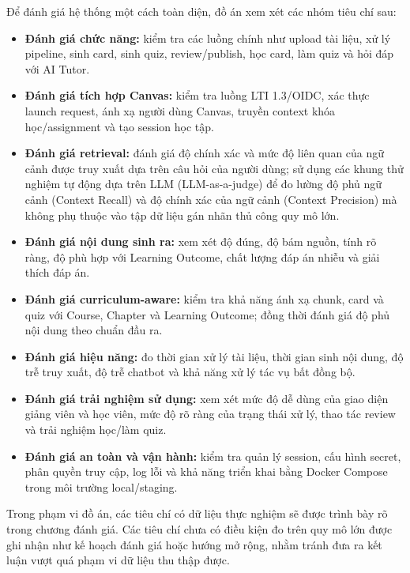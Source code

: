 Để đánh giá hệ thống một cách toàn diện, đồ án xem xét các nhóm tiêu chí
sau:
\begin{itemize}
    \item \textbf{Đánh giá chức năng:} kiểm tra các luồng chính như upload tài
          liệu, xử lý pipeline, sinh card, sinh quiz, review/publish, học card,
          làm quiz và hỏi đáp với AI Tutor.
    \item \textbf{Đánh giá tích hợp Canvas:} kiểm tra luồng LTI 1.3/OIDC, xác
          thực launch request, ánh xạ người dùng Canvas, truyền context khóa
          học/assignment và tạo session học tập.
    \item \textbf{Đánh giá retrieval:} đánh giá độ chính xác và mức độ liên quan
          của ngữ cảnh được truy xuất dựa trên câu hỏi của người dùng; sử dụng 
          các khung thử nghiệm tự động dựa trên LLM (LLM-as-a-judge) để đo lường 
          độ phủ ngữ cảnh (Context Recall) và độ chính xác của ngữ cảnh 
          (Context Precision) mà không phụ thuộc vào tập dữ liệu gán nhãn thủ 
          công quy mô lớn.
    \item \textbf{Đánh giá nội dung sinh ra:} xem xét độ đúng, độ bám nguồn,
          tính rõ ràng, độ phù hợp với Learning Outcome, chất lượng đáp án
          nhiễu và giải thích đáp án.
    \item \textbf{Đánh giá curriculum-aware:} kiểm tra khả năng ánh xạ chunk,
          card và quiz với Course, Chapter và Learning Outcome; đồng thời đánh
          giá độ phủ nội dung theo chuẩn đầu ra.
    \item \textbf{Đánh giá hiệu năng:} đo thời gian xử lý tài liệu, thời gian
          sinh nội dung, độ trễ truy xuất, độ trễ chatbot và khả năng xử lý tác
          vụ bất đồng bộ.
    \item \textbf{Đánh giá trải nghiệm sử dụng:} xem xét mức độ dễ dùng của
          giao diện giảng viên và học viên, mức độ rõ ràng của trạng thái xử
          lý, thao tác review và trải nghiệm học/làm quiz.
    \item \textbf{Đánh giá an toàn và vận hành:} kiểm tra quản lý session,
          cấu hình secret, phân quyền truy cập, log lỗi và khả năng triển khai
          bằng Docker Compose trong môi trường local/staging.
\end{itemize}

Trong phạm vi đồ án, các tiêu chí có dữ liệu thực nghiệm sẽ được trình bày
rõ trong chương đánh giá. Các tiêu chí chưa có điều kiện đo trên quy mô lớn
được ghi nhận như kế hoạch đánh giá hoặc hướng mở rộng, nhằm tránh đưa ra kết
luận vượt quá phạm vi dữ liệu thu thập được.

